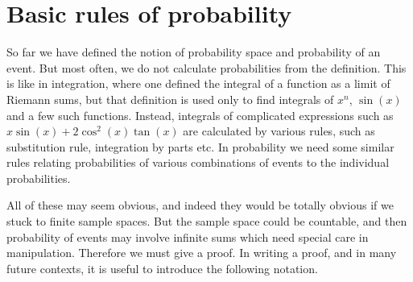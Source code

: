 \documentclass[preprint,  11pt]{amsart}
\renewcommand{\benu}{\begin{enumerate}\setlength\itemsep{6pt}}
\begin{document}



\section{Basic rules of probability}
So far we have defined the notion of probability space and probability of an event. But most often, we do not calculate probabilities from the definition. This is like in integration, where one defined the integral of a function as a limit of Riemann sums, but that definition is used only to find integrals of $x^{n}$, $\sin(x)$ and a few such functions. Instead, integrals of complicated expressions such as $x\sin(x)+2\cos^{2}(x)\tan(x)$ are calculated by various rules, such as substitution rule, integration by parts etc. In probability we need some similar rules relating probabilities of various combinations of events to the individual probabilities.


All of these may seem obvious, and indeed they would be totally obvious if we stuck to finite sample spaces. But the sample space could be countable, and then probability of events may involve infinite sums which need special care in manipulation. Therefore we must give a proof. In writing a proof, and in many future contexts, it is useful to introduce the following notation.
\end{document}
